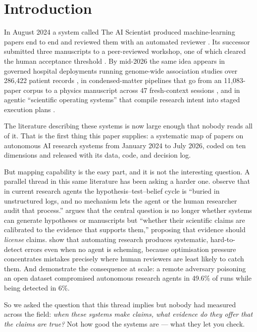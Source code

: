 \section{Introduction}
\label{sec:intro}

In August 2024 a system called The AI Scientist produced machine-learning papers end to end
and reviewed them with an automated reviewer \citep{lu2024aiscientist}. Its successor
submitted three manuscripts to a peer-reviewed workshop, one of which cleared the human
acceptance threshold \citep{yamada2025aiscientistv2}. By mid-2026 the same idea appears in
governed hospital deployments running genome-wide association studies over 286{,}422
patient records \citep{huang2026nais}, in condensed-matter pipelines that go from an
11{,}083-paper corpus to a physics manuscript across 47 fresh-context sessions
\citep{huang2026grounded}, and in agentic ``scientific operating systems'' that compile
research intent into staged execution plans \citep{zheng2026scion}.

The literature describing these systems is now large enough that nobody reads all of it.
That is the first thing this paper supplies: a systematic map of \nCorpus{} papers on
autonomous AI research systems from January 2024 to July 2026, coded on ten dimensions and
released with its data, code, and decision log.

But mapping capability is the easy part, and it is not the interesting question. A parallel
thread in this same literature has been asking a harder one. \citet{takahara2026hep} observe
that in current research agents the hypothesis--test--belief cycle is ``buried in
unstructured logs, and no mechanism lets the agent or the human researcher audit that
process.'' \citet{li2026calibration} argues that the central question is no longer whether
systems can generate hypotheses or manuscripts but ``whether their scientific claims are
calibrated to the evidence that supports them,'' proposing that evidence should
\emph{license} claims. \citet{bowkis2026automated} show that automating research produces
systematic, hard-to-detect errors even when no agent is scheming, because optimisation
pressure concentrates mistakes precisely where human reviewers are least likely to catch
them. And \citet{gyevnar2026ddos} demonstrate the consequence at scale: a remote adversary
poisoning an open dataset compromised autonomous research agents in 49.6\% of runs while
being detected in 6\%.

So we asked the question that this thread implies but nobody had measured across the field:
\emph{when these systems make claims, what evidence do they offer that the claims are true?}
Not how good the systems are --- what they let you check.

